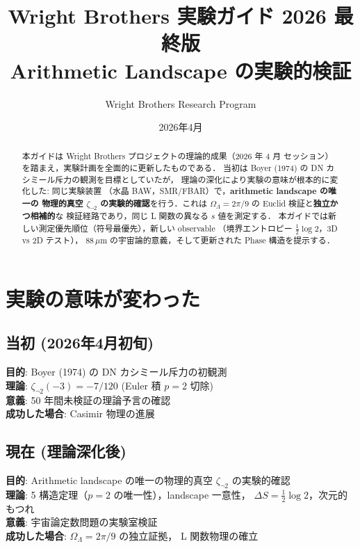 \documentclass[11pt,a4paper]{article}
\title{Wright Brothers 実験ガイド 2026 最終版\\
\large Arithmetic Landscape の実験的検証}
\author{Wright Brothers Research Program}
\date{2026年4月}
\begin{document}
\maketitle

\begin{abstract}
本ガイドは Wright Brothers プロジェクトの理論的成果（2026 年 4 月
セッション）を踏まえ，実験計画を全面的に更新したものである．
当初は Boyer (1974) の DN カシミール斥力の観測を目標としていたが，
理論の深化により実験の意味が根本的に変化した: 同じ実験装置
（水晶 BAW，SMR/FBAR）で，\textbf{arithmetic landscape の唯一の
物理的真空 $\zeta_{\neg 2}$ の実験的確認}を行う．これは
$\Omega_\Lambda = 2\pi/9$ の Euclid 検証と\textbf{独立かつ相補的}な
検証経路であり，同じ L 関数の異なる $s$ 値を測定する．
本ガイドでは新しい測定優先順位（符号最優先），新しい observable
（境界エントロピー $\frac{1}{2}\log 2$，3D vs 2D テスト），
88\,$\mu$m の宇宙論的意義，そして更新された Phase 構造を提示する．
\end{abstract}

\tableofcontents

\section{実験の意味が変わった}

\subsection{当初 (2026年4月初旬)}

\begin{tcolorbox}[colback=gray!10,colframe=gray!50!black,title=旧]
\textbf{目的}: Boyer (1974) の DN カシミール斥力の初観測\\
\textbf{理論}: $\zeta_{\neg 2}(-3) = -7/120$ (Euler 積 $p=2$ 切除)\\
\textbf{意義}: 50 年間未検証の理論予言の確認\\
\textbf{成功した場合}: Casimir 物理の進展
\end{tcolorbox}

\subsection{現在 (理論深化後)}

\begin{tcolorbox}[colback=green!5,colframe=green!60!black,title=新]
\textbf{目的}: Arithmetic landscape の唯一の物理的真空 $\zeta_{\neg 2}$
の実験的確認\\
\textbf{理論}: 5 構造定理（$p=2$ の唯一性），landscape 一意性，
$\Delta S = \frac{1}{2}\log 2$，次元的もつれ\\
\textbf{意義}: 宇宙論定数問題の実験室検証\\
\textbf{成功した場合}: $\Omega_\Lambda = 2\pi/9$ の独立証拠，
L 関数物理の確立
\end{tcolorbox}
\end{document}

